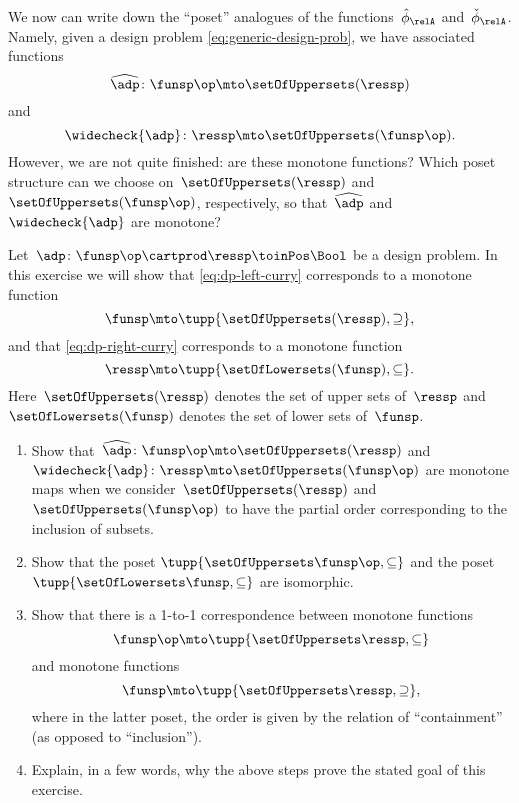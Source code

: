 We now can write down the ``poset'' analogues of the functions~$\hat \phi_{\relA}$ and~$\check \phi_{\relA}$.
Namely, given a design problem \cref{eq:generic-design-prob}, we have associated functions
\begin{equation}
	\label{eq:dp-left-curry}
	\widehat{\adp} \colon \funsp\op \mto \setOfUppersets (\ressp)
\end{equation}
and
\begin{equation}
	\label{eq:dp-right-curry}
	\widecheck{\adp} \colon \ressp \mto \setOfUppersets (\funsp\op).
\end{equation}
However, we are not quite finished: are these monotone functions?
Which poset structure can we choose on~$\setOfUppersets (\ressp)$ and~$\setOfUppersets (\funsp\op)$, respectively, so that~$\widehat{\adp}$ and~$\widecheck{\adp}$ are monotone?

\begin{gradedexercise}
	\label{ex:CurryingDesignProblems}
	Let~$\adp\colon \funsp\op \cartprod \ressp\toinPos \Bool$ be a design problem.
	In this exercise we will show that \cref{eq:dp-left-curry} corresponds to a monotone function
	\begin{equation}
		\funsp \mto \tupp{\setOfUppersets (\ressp), \supseteq},
	\end{equation}
	and that \cref{eq:dp-right-curry} corresponds to a monotone function
	\begin{equation}
		\ressp \mto \tupp{\setOfLowersets(\funsp), \subseteq}.
	\end{equation}
	Here~$\setOfUppersets (\ressp)$ denotes the set of upper sets of~$\ressp$ and~$\setOfLowersets(\funsp)$ denotes the set of lower sets of~$\funsp$.

	\begin{enumerate}
		\item Show that~$\widehat{\adp} \colon \funsp\op \mto \setOfUppersets (\ressp)$ and~$\widecheck{\adp} \colon \ressp \mto \setOfUppersets (\funsp\op)$ are monotone maps when we consider~$\setOfUppersets (\ressp)$ and~$\setOfUppersets (\funsp\op)$ to have the partial order corresponding to the inclusion of subsets.
		\item Show that the poset $\tupp{\setOfUppersets\funsp\op, \subseteq}$ and the poset $\tupp{\setOfLowersets\funsp, \subseteq}$ are isomorphic.
		\item Show that there is a 1-to-1 correspondence between monotone functions
		      \begin{equation}
			      \funsp\op \mto \tupp{\setOfUppersets \ressp, \subseteq}
		      \end{equation}
		      and monotone functions
		      \begin{equation}
			      \funsp \mto \tupp{\setOfUppersets \ressp, \supseteq},
		      \end{equation}
		      where in the latter poset, the order is given by the relation of ``containment'' (as opposed to ``inclusion'').
		\item Explain, in a few words, why the above steps prove the stated goal of this exercise.
	\end{enumerate}
\end{gradedexercise}

